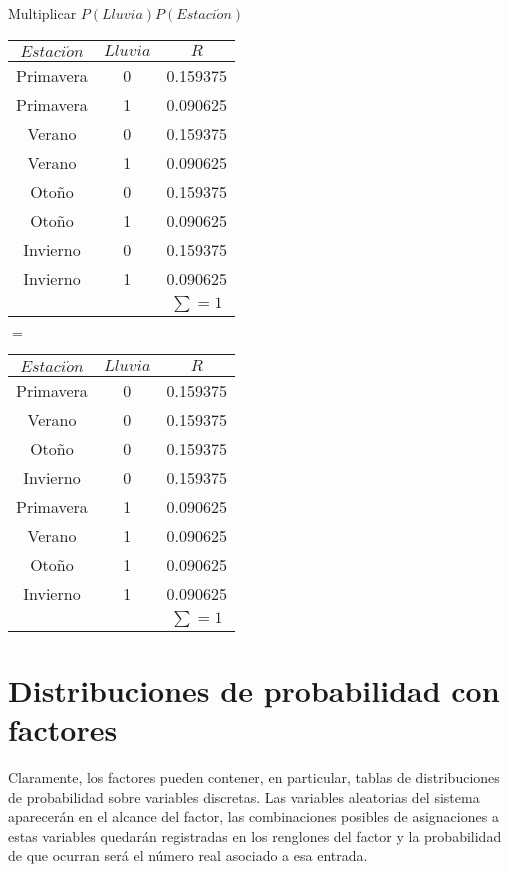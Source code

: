 \begin{example}{Multiplicar $P(Lluvia)P(Estaci\acute{o}n)$}
\begin{center}
\begin{center}
\begin{tabular}{cc|c}
 $Estaci\acute{o}n$ & $Lluvia$ & $R$ \\ \toprule
 \rowcolor{\colTableRow}Primavera & 0 & 0.159375 \\
 \rowcolor{\colTableRow!30}Primavera & 1 & 0.090625 \\
 \rowcolor{\colTableRowOne}Verano & 0 & 0.159375 \\
 \rowcolor{\colTableRowOne!30}Verano & 1 & 0.090625 \\
 \rowcolor{\colTableRowTwo}Otoño & 0 & 0.159375 \\
 \rowcolor{\colTableRowTwo!30}Otoño & 1 & 0.090625 \\
 \rowcolor{\colTableRowThree}Invierno & 0 & 0.159375 \\
 \rowcolor{\colTableRowThree!30}Invierno & 1 & 0.090625 \\
 \multicolumn{2}{c}{}  & $\sum=1$
\end{tabular}$=$
\begin{tabular}{cc|c}
 $Estaci\acute{o}n$ & $Lluvia$ & $R$ \\ \toprule
 \rowcolor{\colTableRow}Primavera & 0 & 0.159375 \\
 \rowcolor{\colTableRowOne}Verano & 0 & 0.159375 \\
 \rowcolor{\colTableRowTwo}Otoño & 0 & 0.159375 \\
 \rowcolor{\colTableRowThree}Invierno & 0 & 0.159375 \\
 \rowcolor{\colTableRow!30}Primavera & 1 & 0.090625 \\
 \rowcolor{\colTableRowOne!30}Verano & 1 & 0.090625 \\
 \rowcolor{\colTableRowTwo!30}Otoño & 1 & 0.090625 \\
 \rowcolor{\colTableRowThree!30}Invierno & 1 & 0.090625 \\
 \multicolumn{2}{c}{}  & $\sum=1$
\end{tabular}
\end{center}
\end{center}
\end{example}


\section{Distribuciones de probabilidad con factores}

Claramente, los factores pueden contener, en particular, tablas de distribuciones de probabilidad sobre variables discretas.  Las variables aleatorias del sistema aparecerán en el alcance del factor, las combinaciones posibles de asignaciones a estas variables quedarán registradas en los renglones del factor y la probabilidad de que ocurran será el número real asociado a esa entrada.


